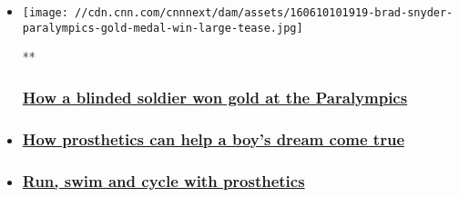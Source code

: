 \begin{itemize}
\item
  \href{/videos/world/2016/06/17/vital-signs-paralympians-spc-b.cnn}{}

  \texttt{[image: //cdn.cnn.com/cnnnext/dam/assets/160610101919-brad-snyder-paralympics-gold-medal-win-large-tease.jpg]}

  **

  \hypertarget{how-a-blinded-soldier-won-gold-at-the-paralympics}{%
  \subsubsection{\texorpdfstring{\href{/videos/world/2016/06/17/vital-signs-paralympians-spc-b.cnn}{How
  a blinded soldier won gold at the
  Paralympics}}{How a blinded soldier won gold at the Paralympics}}\label{how-a-blinded-soldier-won-gold-at-the-paralympics}}
\item
  \hypertarget{how-prosthetics-can-help-a-boys-dream-come-true}{%
  \subsubsection{\texorpdfstring{\href{/videos/world/2016/06/17/vital-signs-paralympians-spc-c.cnn}{How
  prosthetics can help a boy's dream come
  true}}{How prosthetics can help a boy's dream come true}}\label{how-prosthetics-can-help-a-boys-dream-come-true}}
\item
  \hypertarget{run-swim-and-cycle-with-prosthetics}{%
  \subsubsection{\texorpdfstring{\href{/videos/world/2016/06/17/vital-signs-paralympians-spc-a.cnn}{Run,
  swim and cycle with
  prosthetics}}{Run, swim and cycle with prosthetics}}\label{run-swim-and-cycle-with-prosthetics}}
\end{itemize}

